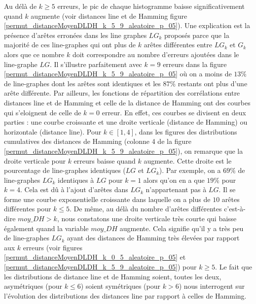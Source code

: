Au d\'el\`a de $k \ge 5$ erreurs, le pic de chaque histogramme baisse significativement quand $k$ augmente (voir distances line et de  Hamming figure \ref{permut_distanceMoyenDLDH_k_5_9_aleatoire_p_05}). Une explication est la pr\'esence d'ar\^etes erron\'ees dans les line graphes $LG_k$ propos\'es parce que la majorit\'e de ces line-graphes qui ont plus de $k$ ar\^etes diff\'erentes entre $LG_k$ et $G_k$ alors que ce nombre $k$ doit correspondre au nombre d'erreurs ajout\'ees dans le line-graphe $LG$. Il s'illustre parfaitement avec $k = 9$ erreurs dans la figure \ref{permut_distanceMoyenDLDH_k_5_9_aleatoire_p_05} o\`u on a moins de $13\%$ de line-graphes dont les ar\^etes sont identiques et les $87\%$ restants ont plus d'une  ar\^ete diff\'erente.
\newline
Par ailleurs, les fonctions de r\'epartition des corr\'elations entre distances line et de Hamming et celle de la distance de Hamming ont des courbes  qui s'eloignent de celle de $k = 0$ erreur. En effet, ces courbes se divisent en deux parties : une courbe croissante et une droite verticale (distance de Hamming) ou horizontale (distance line). 
Pour $k \in [1,4]$, dans les figures des distributions cumulatives des distances de Hamming (colonne 4 de la figure \ref{permut_distanceMoyenDLDH_k_5_9_aleatoire_p_05}), on remarque que la droite verticale pour $k$ erreurs baisse quand $k$ augmente. Cette droite est le pourcentage de line-graphes identiques ($LG$ et $LG_k$). Par exemple, on a $69\%$ de line-graphes $LG_k$ identiques \`a $LG$ pour $k = 1$ alors qu'on en a que $19\%$ pour $k=4$. Cela est d\^u \`a l'ajout d'ar\^etes dans $LG_k$ n'appartenant pas \`a $LG$. Il se  forme une courbe exponentielle croissante dans laquelle on a plus de $10$ ar\^etes diff\'erentes pour $k \le 5$.  \newline
De m\^eme, au d\'el\`a du nombre d'ar\^etes diff\'erentes c'est-\`a-dire $moy\_DH > k$, nous constatons une droite verticale tr\`es courte qui baisse \'egalement quand la variable $moy\_DH$ augmente. Cela signifie qu'il y a tr\`es peu de line-graphes $LG_k$ ayant des  distances de Hamming tr\`es \'elev\'ees par rapport aux $k$ erreurs (voir figures \ref{permut_distanceMoyenDLDH_k_0_5_aleatoire_p_05} et \ref{permut_distanceMoyenDLDH_k_5_9_aleatoire_p_05})  pour $k \ge 5$.
\newline
Le fait que les distributions de distance line et de Hamming soient, toutes les deux, asym\'etriques (pour $k \le 6$) soient sym\'etriques (pour $k>6$) nous interrogent sur l'\'evolution des distributions des distances line par rapport \`a celles de Hamming. 